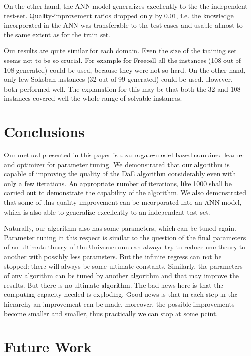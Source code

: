 \documentclass{acm_proc_article-sp}
\begin{document}
On the other hand, the ANN model generalizes excellently to the the independent test-set. Quality-improvement ratios dropped only by 0.01, i.e. the knowledge incorporated in the ANN was transferable to the test cases and usable almost to the same extent as for the train set.

Our results are quite similar for each domain. Even the size of the training set seems not to be so crucial. For example for Freecell all the instances (108 out of 108 generated) could be used, because they were not so hard. On the other hand, only few Sokoban instances (32 out of 99 generated) could be used. However, both performed well. The explanation for this may be that both the 32 and 108 instances covered well the whole range of solvable instances.

\section{Conclusions}
\label{section:conclusions}

Our method presented in this paper is a surrogate-model based combined learner and optimizer for parameter tuning. We demonstrated that our algorithm is capable of improving the quality of the DaE algorithm considerably even with only a few iterations. An appropriate number of iterations, like 1000 shall be carried out to demonstrate the capability of the algorithm. We also demonstrated that some of this quality-improvement can be incorporated into an ANN-model, which is also able to generalize excellently to an independent test-set.

Naturally, our algorithm also has some parameters, which can be tuned again. Parameter tuning in this respect is similar to the question of the final parameters of an ultimate theory of the Universe: one can always try to reduce one theory to another with possibly less parameters. But the infinite regress can not be stopped: there will always be some ultimate constants. Similarly, the parameters of any algorithm can be tuned by another algorithm and that may improve the results. But there is no ultimate algorithm. The bad news here is that the computing capacity needed is exploding. Good news is that in each step in the hierarchy an improvement can be made, moreover, the possible improvements become smaller and smaller, thus practically we can stop at some point. 


\section{Future Work}
\label{section:futurework}	
\end{document}
